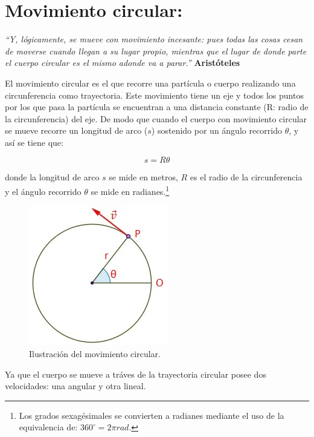 \documentclass[a5paper,pagesize,10pt,bibtotoc,pointlessnumbers,
normalheadings,DIV=9,fleqn,x11names,table,twoside=false]{scrbook}
\begin{document}
\chapter{Movimiento circular:}

\textit{``Y, lógicamente, se mueve con movimiento incesante: pues todas las cosas cesan de moverse cuando llegan a su lugar 
propio, mientras que el lugar de donde parte el cuerpo circular es el mismo adonde va a parar.''} \textbf{Aristóteles}
\vspace{1.0cm}

El movimiento circular es el que recorre una partícula o cuerpo realizando una circunferencia como trayectoria. Este movimiento 
tiene un eje y todos los puntos por los que pasa la partícula se encuentran a una distancia constante (R: radio de la 
circunferencia) del eje. De modo que cuando el cuerpo con movimiento circular se mueve recorre un longitud de arco ($s$) 
sostenido por un ángulo recorrido $\theta$, y así se tiene que:

\begin{equation}
 s = R\theta
\end{equation}

donde la longitud de arco $s$ se mide en metros, $R$ es el radio de la circunferencia y el ángulo recorrido $\theta$ se mide en 
radianes.\footnote{Los grados sexagésimales se convierten a radianes mediante el uso de la equivalencia de: $360^\circ = 2\pi 
rad$.}

\begin{figure}[ht]
 \centering
 \includegraphics[scale=0.6]{images/movimiento-circular.jpg}
 \caption{Ilustración del movimiento circular.}\label{circular}
\end{figure}   

Ya que el cuerpo se mueve a tráves de la trayectoria circular posee dos velocidades: una angular y otra lineal.\\
\end{document}
